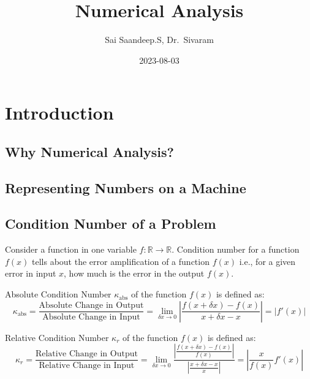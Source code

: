 \documentclass[
]{book}
\title{Numerical Analysis}
\author{Sai Saandeep.S, Dr.~Sivaram}
\date{2023-08-03}
\begin{document}
\maketitle

{
\setcounter{tocdepth}{1}
\tableofcontents
}
\hypertarget{introduction}{%
\chapter{Introduction}\label{introduction}}

\hypertarget{why-numerical-analysis}{%
\section{Why Numerical Analysis?}\label{why-numerical-analysis}}

\hypertarget{representing-numbers-on-a-machine}{%
\section{Representing Numbers on a Machine}\label{representing-numbers-on-a-machine}}

\hypertarget{condition-number-of-a-problem}{%
\section{Condition Number of a Problem}\label{condition-number-of-a-problem}}

Consider a function in one variable \(f:\mathbb{R}\to\mathbb{R}\).
Condition number for a function \(f(x)\) tells about the error amplification of a function \(f(x)\) i.e., for a given error in input \(x\), how much is the error in the output \(f(x)\).

Absolute Condition Number \(\kappa_{\text{abs}}\) of the function \(f(x)\) is defined as:
\begin{equation}
\kappa_{\text{abs}} = \frac{\text{Absolute Change in Output}}{\text{Absolute Change in Input}} = \lim_{\delta x \to 0} \left\lvert{\frac{f(x+\delta x)-f(x)}{x+\delta x - x}}\right\rvert = \left\lvert{f'(x)}\right\rvert
\end{equation}

Relative Condition Number \(\kappa_{r}\) of the function \(f(x)\) is defined as:
\begin{equation}
\kappa_{r} = \frac{\text{Relative Change in Output}}{\text{Relative Change in Input}} = \lim_{\delta x \to 0} \frac{\left\lvert{\frac{f(x+\delta x)-f(x)}{f(x)}}\right\rvert}{\left\lvert{\frac{x+\delta x - x}{x}}\right\rvert} = \left\lvert{\frac{x}{f(x)}f'(x)}\right\rvert
\end{equation}
\end{document}
